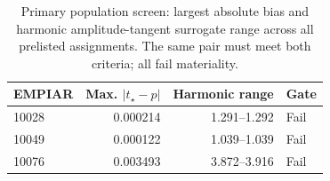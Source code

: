 \begin{table}[t]
\centering\small
\caption{Primary population screen: largest absolute bias and harmonic amplitude-tangent surrogate range across all prelisted assignments. The same pair must meet both criteria; all fail materiality.}
\label{tab:diag-population}
\begin{tabular}{lrrl}
\toprule
EMPIAR & Max. $|t_\star-p|$ & Harmonic range & Gate\\
\midrule
10028 & 0.000214 & 1.291--1.292 & Fail\\
10049 & 0.000122 & 1.039--1.039 & Fail\\
10076 & 0.003493 & 3.872--3.916 & Fail\\
\bottomrule
\end{tabular}
\end{table}
